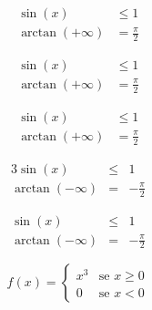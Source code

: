 \documentclass[]{article}
\begin{document}
	\begin{align}
		\sin(x) & \leq 1 \\
		\arctan(+\infty) & = \frac{\pi}{2}
	\end{align}

	\begin{subequations}
		\begin{align}
			\sin(x) & \leq 1 \\
			\arctan(+\infty) & = \frac{\pi}{2}
		\end{align}
	\end{subequations}

	\[
		\begin{aligned}
			\sin(x) & \leq 1 \\
			\arctan(+\infty) & = \frac{\pi}{2}
		\end{aligned}
	\]

	\begin{alignat}{3}
		\sin(x) & \leq &  1 \\
		\arctan(-\infty) & = & - \frac{\pi}{2}
	\end{alignat}

	\[
		\begin{alignedat}{3}
			\sin(x) & \leq & 1 \\
			\arctan(-\infty) & = & - \frac{\pi}{2}
		\end{alignedat}
	\]

	\begin{equation}
		f(x) = 
		\begin{cases}
		x^3 & \text{se } x \geq 0 \\
		0 & \text{se } x < 0
		\end{cases}
	\end{equation}
\end{document}

